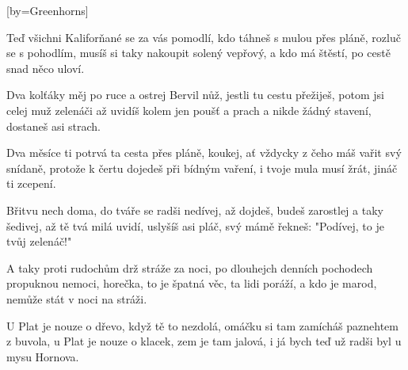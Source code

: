 [by={Greenhorns}]

\beginverse{}
Teď všichni Kaliforňané se za vás pomodlí,
kdo táhneš s mulou přes pláně, rozluč se s pohodlím,
musíš si taky nakoupit solený vepřový,
a kdo má štěstí, po cestě snad něco uloví.
\endverse{}

\beginverse{}
Dva kolťáky měj po ruce a ostrej Bervil nůž,
jestli tu cestu přežiješ, potom jsi celej muž
zelenáči až uvidíš kolem jen poušť a prach
a nikde žádný stavení, dostaneš asi strach.
\endverse{}

\beginverse{}
Dva měsíce ti potrvá ta cesta přes pláně,
koukej, ať vždycky z čeho máš vařit svý snídaně,
protože k čertu dojedeš při bídným vaření,
i tvoje mula musí žrát, jináč ti zcepení.
\endverse{}

\beginverse{}
Břitvu nech doma, do tváře se radši nedívej,
až dojdeš, budeš zarostlej a taky šedivej,
až tě tvá milá uvidí, uslyšíš asi pláč,
svý mámě řekneš: "Podívej, to je tvůj zelenáč!"
\endverse{}

\beginverse{}
A taky proti rudochům drž stráže za noci,
po dlouhejch denních pochodech propuknou nemoci,
horečka, to je špatná věc, ta lidi poráží,
a kdo je marod, nemůže stát v noci na stráži.
\endverse{}

\beginverse{}
U Plat je nouze o dřevo, když tě to nezdolá,
omáčku si tam zamícháš paznehtem z buvola,
u Plat je nouze o klacek, zem je tam jalová,
i já bych teď už radši byl u mysu Hornova.
\endverse{}

\endsong{}
